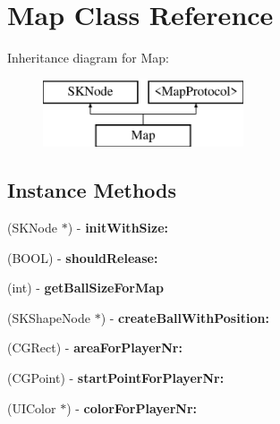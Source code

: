 \hypertarget{interface_map}{\section{Map Class Reference}
\label{interface_map}
}
Inheritance diagram for Map\+:\begin{figure}[H]
\begin{center}
\leavevmode
\includegraphics[height=2.000000cm]{interface_map}
\end{center}
\end{figure}
\subsection*{Instance Methods}
\begin{DoxyCompactItemize}
\item 
\hypertarget{interface_map_a008a89cb173753d6425e606ef5e88d73}{(S\+K\+Node $\ast$) -\/ {\bfseries init\+With\+Size\+:}}\label{interface_map_a008a89cb173753d6425e606ef5e88d73}

\item 
\hypertarget{interface_map_a83cc2dc7c5734eb3bda48e99fc15beaf}{(B\+O\+O\+L) -\/ {\bfseries should\+Release\+:}}\label{interface_map_a83cc2dc7c5734eb3bda48e99fc15beaf}

\item 
\hypertarget{interface_map_ab8996e299ab746d6ca386a1f6ca183dc}{(int) -\/ {\bfseries get\+Ball\+Size\+For\+Map}}\label{interface_map_ab8996e299ab746d6ca386a1f6ca183dc}

\item 
\hypertarget{interface_map_a6147f3c603d1ca4ebd47d49c54f28704}{(S\+K\+Shape\+Node $\ast$) -\/ {\bfseries create\+Ball\+With\+Position\+:}}\label{interface_map_a6147f3c603d1ca4ebd47d49c54f28704}

\item 
\hypertarget{interface_map_a6f4bef62fcfa210922cd63e0ef15c927}{(C\+G\+Rect) -\/ {\bfseries area\+For\+Player\+Nr\+:}}\label{interface_map_a6f4bef62fcfa210922cd63e0ef15c927}

\item 
\hypertarget{interface_map_a839f719e4ad796c1c221cd1f90b9de34}{(C\+G\+Point) -\/ {\bfseries start\+Point\+For\+Player\+Nr\+:}}\label{interface_map_a839f719e4ad796c1c221cd1f90b9de34}

\item 
\hypertarget{interface_map_a84bdda86845b75f2d1d8ced7d39a7dfe}{(U\+I\+Color $\ast$) -\/ {\bfseries color\+For\+Player\+Nr\+:}}\label{interface_map_a84bdda86845b75f2d1d8ced7d39a7dfe}

\end{DoxyCompactItemize}
